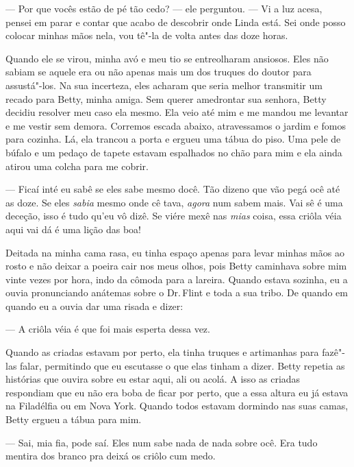 --- Por que vocês estão de pé tão cedo? --- ele perguntou. --- Vi a luz
acesa, pensei em parar e contar que acabo de descobrir onde Linda está.
Sei onde posso colocar minhas mãos nela, vou tê"-la de volta antes das
doze horas.

Quando ele se virou, minha avó e meu tio se entreolharam ansiosos. Eles
não sabiam se aquele era ou não apenas mais um dos truques do doutor
para assustá"-los. Na sua incerteza, eles acharam que seria melhor
transmitir um recado para Betty, minha amiga. Sem querer amedrontar sua
senhora, Betty decidiu resolver meu caso ela mesmo. Ela veio até mim e
me mandou me levantar e me vestir sem demora. Corremos escada abaixo,
atravessamos o jardim e fomos para cozinha. Lá, ela trancou a porta e
ergueu uma tábua do piso. Uma pele de búfalo e um pedaço de tapete
estavam espalhados no chão para mim e ela ainda atirou uma colcha para
me cobrir.

--- Ficaí inté eu sabê se eles sabe mesmo docê. Tão dizeno que vão pegá
ocê até as doze. Se eles \emph{sabia} mesmo onde cê tava, \emph{agora}
num sabem mais. Vai sê é uma deceção, isso é tudo qu'eu vô dizê. Se
viére mexê nas \emph{mias} coisa, essa criôla véia aqui vai dá é uma
lição das boa!

Deitada na minha cama rasa, eu tinha espaço apenas para levar minhas
mãos ao rosto e não deixar a poeira cair nos meus olhos, pois Betty
caminhava sobre mim vinte vezes por hora, indo da cômoda para a lareira.
Quando estava sozinha, eu a ouvia pronunciando anátemas sobre o Dr.\,Flint e toda a sua tribo. De quando em quando eu a ouvia dar uma risada
e dizer:

--- A criôla véia é que foi mais esperta dessa vez.

Quando as criadas estavam por perto, ela tinha truques e artimanhas para
fazê"-las falar, permitindo que eu escutasse o que elas tinham a dizer.
Betty repetia as histórias que ouvira sobre eu estar aqui, ali ou acolá.
A isso as criadas respondiam que eu não era boba de ficar por perto, que
a essa altura eu já estava na Filadélfia ou em Nova York. Quando todos
estavam dormindo nas suas camas, Betty ergueu a tábua para mim.

--- Sai, mia fia, pode saí. Eles num sabe nada de nada sobre ocê. Era
tudo mentira dos branco pra deixá os criôlo cum medo.


